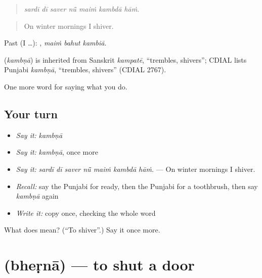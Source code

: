 \begin{quote}
      
\end{quote}

\begin{quote}
\emph{sardī dī saver nū̃ maiṁ kambdā hāṁ.}
\end{quote}

\begin{quote}
On winter mornings I shiver.
\end{quote}

Past (I …):   , \emph{maiṁ bahut kambiā}.

\begin{cousinweb}
\textbf{} (\emph{kambṇā}) is inherited from Sanskrit \emph{kampatē}, \textquotedblleft{}trembles, shivers\textquotedblright{}; CDIAL lists Punjabi \emph{kambṇā}, \textquotedblleft{}trembles, shivers\textquotedblright{} (CDIAL 2767).
\end{cousinweb}

\begin{grammarlens}[title={What you've built}]
One more word for saying what you do.
\end{grammarlens}

\subsection*{Your turn}
\begin{itemize}
\raggedright
  \item \emph{Say it:} \emph{kambṇā}
  \item \emph{Say it:} \emph{kambṇā}, once more
  \item \emph{Say it:} \emph{sardī dī saver nū̃ maiṁ kambdā hāṁ.} — On winter mornings I shiver.
  \item \emph{Recall:} say the Punjabi for ready, then the Punjabi for a toothbrush, then say \emph{kambṇā} again
  \item \emph{Write it:} copy \textbf{} once, checking the whole word
\end{itemize}

\begin{tcolorbox}[breakable,colback=teal!4,colframe=teal!35!black,title={Before you move on}]
What does  mean? (\textquotedblleft{}To shiver\textquotedblright{}.) Say it once more.
\end{tcolorbox}
\section[\texorpdfstring{\pa{ਭੇੜਨਾ} (bheṛnā)}{ਭੇੜਨਾ (bheṛnā)}]{ (bheṛnā) — to shut a door}

